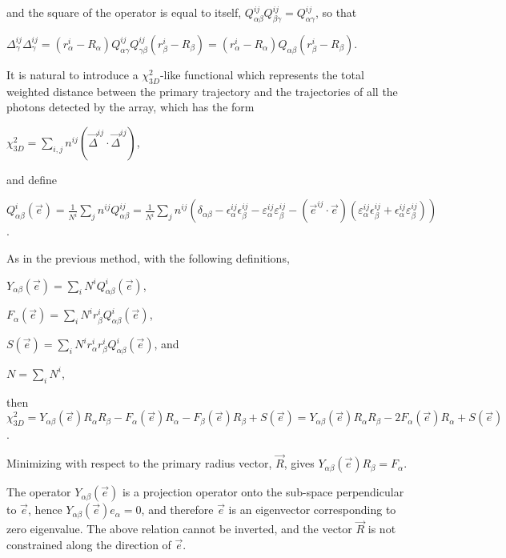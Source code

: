 \documentclass[letterpaper]{article}
\begin{document}
and the square of the operator is equal to itself,
$Q_{\alpha\beta}^{ij}Q_{\beta\gamma}^{ij}=Q_{\alpha\gamma}^{ij}$,
so that

$\displaystyle \Delta_{\gamma}^{ij}\Delta_{\gamma}^{ij}
=(r_{\alpha}^{i}-R_{\alpha})Q_{\alpha\gamma}^{ij}Q_{\gamma\beta}^{ij}
(r_{\beta}^{i}-R_{\beta})=
(r_{\alpha}^{i}-R_{\alpha})Q_{\alpha\beta}(r_{\beta}^{i}-R_{\beta})$.

It is natural to introduce a $\chi_{3D}^{2}$-like functional which
represents the total weighted distance between the primary trajectory
and the trajectories of all the photons detected by the array, which
has the form

$\displaystyle \chi_{3D}^{2}=\sum\limits_{i,j}n^{ij}
\left(\vec{\Delta}^{ij}\cdot\vec{\Delta}^{ij}\right)$,

and define 

$\displaystyle Q_{\alpha\beta}^{i}(\vec{e})=
\frac{1}{N^{i}}\sum\limits_{j}n^{ij}Q_{\alpha\beta}^{ij}=
\frac{1}{N^{i}}\sum\limits_{j}n^{ij}
\left(\delta_{\alpha\beta}-\epsilon_{\alpha}^{ij}\epsilon_{\beta}^{ij}
-\varepsilon_{\alpha}^{ij}\varepsilon_{\beta}^{ij}
-(\vec{e}^{ij}\cdot\vec{e})
(\varepsilon_{\alpha}^{ij}\epsilon_{\beta}^{ij}
+\epsilon_{\alpha}^{ij}\varepsilon_{\beta}^{ij})\right)$.

As in the previous method, with the following definitions,

$\displaystyle Y_{\alpha\beta}(\vec{e})
=\sum\limits_{i}N^{i}Q_{\alpha\beta}^{i}(\vec{e})$,

$\displaystyle F_{\alpha}(\vec{e})
=\sum\limits_{i}N^{i}r_{\beta}^{i}Q_{\alpha\beta}^{i}(\vec{e})$,

$\displaystyle S(\vec{e})=
\sum\limits_{i}N^{i}r_{\alpha}^{i}r_{\beta}^{i}Q_{\alpha\beta}^{i}(\vec{e})$,
and

$\displaystyle N=\sum\limits_{i}N^{i}$,

then $\displaystyle \chi_{3D}^{2}
=Y_{\alpha\beta}(\vec{e})R_{\alpha}R_{\beta}-F_{\alpha}(\vec{e})R_{\alpha}
-F_{\beta}(\vec{e})R_{\beta}+S(\vec{e})
=Y_{\alpha\beta}(\vec{e})R_{\alpha}R_{\beta}-2F_{\alpha}(\vec{e})R_{\alpha}
+S(\vec{e})$.

Minimizing with respect to the primary radius vector, $\vec{R}$, gives
$Y_{\alpha\beta}(\vec{e})R_{\beta}=F_{\alpha}$.

The operator $Y_{\alpha\beta}(\vec{e})$ is a projection operator onto
the sub-space perpendicular to $\vec{e}$, hence
$Y_{\alpha\beta}(\vec{e})e_{\alpha}=0$, and therefore $\vec{e}$ is an
eigenvector corresponding to zero eigenvalue. The above relation
cannot be inverted, and the vector $\vec{R}$ is not constrained along
the direction of $\vec{e}$.
\end{document}
